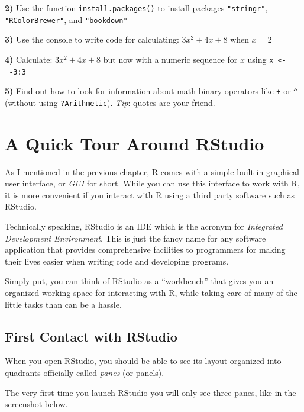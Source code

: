 \documentclass[
]{book}
\begin{document}
\textbf{2)} Use the function \texttt{install.packages()} to install packages \texttt{"stringr"},
\texttt{"RColorBrewer"}, and \texttt{"bookdown"}

\textbf{3)} Use the console to write code for calculating: \(3x^2 + 4x + 8\) when \(x = 2\)

\textbf{4)} Calculate: \(3x^2 + 4x + 8\) but now with a numeric sequence for \(x\)
using \texttt{x\ \textless{}-\ -3:3}

\textbf{5)} Find out how to look for information about math binary operators
like \texttt{+} or \texttt{\^{}} (without using \texttt{?Arithmetic}). \emph{Tip}: quotes are your friend.

\hypertarget{rstudio}{%
\chapter{A Quick Tour Around RStudio}\label{rstudio}}

As I mentioned in the previous chapter, R comes with a simple built-in graphical
user interface, or \emph{GUI} for short. While you can use this interface to
work with R, it is more convenient if you interact with R using a third party
software such as RStudio.

Technically speaking, RStudio is an IDE which is the acronym for
\emph{Integrated Development Environment}. This is just the fancy name for any
software application that provides comprehensive facilities to programmers for
making their lives easier when writing code and developing programs.

Simply put, you can think of RStudio as a ``workbench'' that gives you an
organized working space for interacting with R, while taking care of many of
the little tasks than can be a hassle.

\hypertarget{first-contact-with-rstudio}{%
\section{First Contact with RStudio}\label{first-contact-with-rstudio}}

When you open RStudio, you should be able to see its layout organized into
quadrants officially called \emph{panes} (or panels).

The very first time you launch RStudio you will only see three panes, like in
the screenshot below.
\end{document}
